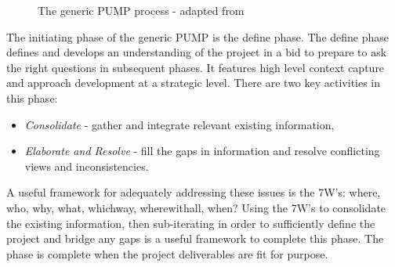 \begin{figure}[!h]
  \centering
{} \quad
{}
\caption{The generic PUMP process - adapted from \cite{chapman}}
\label{Figure:GenericPUMP_Both}
\end{figure}

The initiating phase of the generic PUMP is the define phase.
The define phase defines and develops an understanding of the project in a bid to prepare to ask the right questions in subsequent phases.
It features high level context capture and approach development at a strategic level.
There are two key activities in this phase:
\begin{itemize}
\item \textit{Consolidate} - gather and integrate relevant existing information,
\item \textit{Elaborate and Resolve} - fill the gaps in information and resolve conflicting views and inconsistencies.
\end{itemize}
A useful framework for adequately addressing these issues is the 7W's: where, who, why, what, whichway, wherewithall, when? 
Using the 7W's to consolidate the existing information, then sub-iterating in order to sufficiently define the project and bridge any gaps is a useful framework to complete this phase.
The phase is complete when the project deliverables are fit for purpose.



